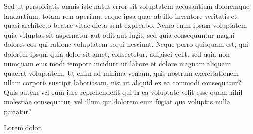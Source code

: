 \documentclass{article}
\begin{document}
\beginnumbering
\pstart
	\lipsum[1]
\pend
\endnumbering


\begin{pairs}  
\begin{Leftside} 
    \beginnumbering  
    \pstart  
	\lipsum[1]
    \pend  
    \pausenumbering
\end{Leftside} 
\begin{Rightside}   
    \beginnumbering  
    \pstart  
    Sed ut perspiciatis  omnis iste natus error sit voluptatem accusantium doloremque laudantium, totam rem aperiam, eaque ipsa quae ab illo inventore veritatis et quasi architecto beatae vitae dicta sunt explicabo. Nemo enim ipsam voluptatem quia voluptas sit aspernatur aut odit aut fugit, sed quia consequuntur magni dolores eos qui ratione voluptatem sequi nesciunt. Neque porro quisquam est, qui dolorem ipsum quia dolor sit amet, consectetur, adipisci velit, sed quia non numquam eius modi tempora incidunt ut labore et dolore magnam aliquam quaerat voluptatem. Ut enim ad minima veniam, quis nostrum exercitationem ullam corporis suscipit laboriosam, nisi ut aliquid ex ea commodi consequatur? Quis autem vel eum iure reprehenderit qui in ea voluptate velit esse quam nihil molestiae consequatur, vel illum qui dolorem eum fugiat quo voluptas nulla pariatur?
    \pend  
    \pausenumbering
\end{Rightside}  
\end{pairs}  
\Columns

\resumenumbering
\pstart  
    Lorem  dolor.
\pend  
\pausenumbering
\end{document}

